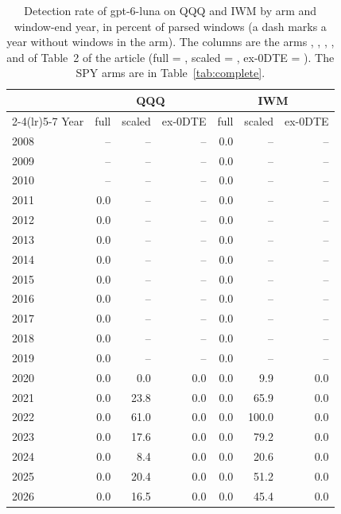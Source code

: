 \begin{table}[H]
\centering
\caption{Detection rate of gpt-6-luna on QQQ and IWM by arm and window-end year, in percent of parsed windows (a dash marks a year without windows in the arm). The columns are the arms , , , ,  and  of Table~2 of the article (full = , scaled = , ex-0DTE = ). The SPY arms are in Table~\ref{tab:complete}.}
\label{tab:s:llm}
\footnotesize
\begin{tabular}{@{}lrrrrrr@{}}
\toprule
 & \multicolumn{3}{c}{QQQ} & \multicolumn{3}{c}{IWM} \\
\cmidrule(lr){2-4}\cmidrule(lr){5-7}
Year & full & scaled & ex-0DTE & full & scaled & ex-0DTE \\
\midrule
2008 & -- & -- & -- & 0.0 & -- & -- \\
2009 & -- & -- & -- & 0.0 & -- & -- \\
2010 & -- & -- & -- & 0.0 & -- & -- \\
2011 & 0.0 & -- & -- & 0.0 & -- & -- \\
2012 & 0.0 & -- & -- & 0.0 & -- & -- \\
2013 & 0.0 & -- & -- & 0.0 & -- & -- \\
2014 & 0.0 & -- & -- & 0.0 & -- & -- \\
2015 & 0.0 & -- & -- & 0.0 & -- & -- \\
2016 & 0.0 & -- & -- & 0.0 & -- & -- \\
2017 & 0.0 & -- & -- & 0.0 & -- & -- \\
2018 & 0.0 & -- & -- & 0.0 & -- & -- \\
2019 & 0.0 & -- & -- & 0.0 & -- & -- \\
2020 & 0.0 & 0.0 & 0.0 & 0.0 & 9.9 & 0.0 \\
2021 & 0.0 & 23.8 & 0.0 & 0.0 & 65.9 & 0.0 \\
2022 & 0.0 & 61.0 & 0.0 & 0.0 & 100.0 & 0.0 \\
2023 & 0.0 & 17.6 & 0.0 & 0.0 & 79.2 & 0.0 \\
2024 & 0.0 & 8.4 & 0.0 & 0.0 & 20.6 & 0.0 \\
2025 & 0.0 & 20.4 & 0.0 & 0.0 & 51.2 & 0.0 \\
2026 & 0.0 & 16.5 & 0.0 & 0.0 & 45.4 & 0.0 \\
\bottomrule
\end{tabular}
\end{table}

